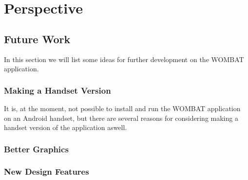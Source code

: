 \chapter{Perspective}


\section{Future Work}
In this section we will list some ideas for further development on the WOMBAT application.

\subsection{Making a Handset Version}
It is, at the moment, not possible to install and run the WOMBAT application on an Android handset, but there are several reasons for considering making a handset version of the application aswell.

\subsection{Better Graphics}


\subsection{New Design Features}
